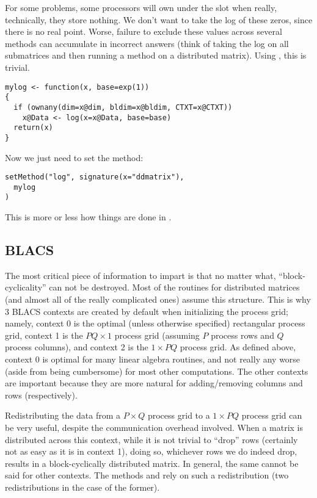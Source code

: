 For some problems, some processors will own  under the  slot when really, technically, they store nothing.  We don't want to take the log of these zeros, since there is no real point.  Worse, failure to exclude these values across several methods can accumulate in incorrect answers (think of taking the log on all submatrices and then running a  method on a distributed matrix).  Using , this is trivial.

\begin{lstlisting}[language=rr,title=Generating in Parallel]
mylog <- function(x, base=exp(1))
{
  if (ownany(dim=x@dim, bldim=x@bldim, CTXT=x@CTXT))
    x@Data <- log(x=x@Data, base=base)
  return(x)
}
\end{lstlisting}

Now we just need to set the method:

\begin{lstlisting}[language=rr,title=Generating in Parallel]
setMethod("log", signature(x="ddmatrix"),
  mylog
)

\end{lstlisting}

This is more or less how things are done in .

\subsection{BLACS}
\label{sec:ictxt}

The most critical piece of information to impart is that no matter what, ``block-cyclicality'' can not be destroyed.  Most of the routines for distributed matrices (and almost all of the really complicated ones) assume this structure.  This is why 3 BLACS contexts are created by default when initializing the process grid; namely, context 0 is the optimal (unless otherwise specified) rectangular process grid, context 1 is the $PQ\times 1$ process grid (assuming $P$ process rows and $Q$ process columns), and context 2 is the $1\times PQ$ process grid.  As defined above, context 0 is optimal for many linear algebra routines, and not really any worse (aside from being cumbersome) for most other computations.  The other contexts are important because they are more natural for adding/removing columns and rows (respectively).

Redistributing the data from a $P\times Q$ process grid to a $1\times PQ$ process grid can be very useful, despite the communication overhead involved.  When a matrix is distributed across this context, while it is not trivial to ``drop'' rows (certainly not as easy as it is in context 1), doing so, whichever rows we do indeed drop, results in a block-cyclically distributed matrix.  In general, the same cannot be said for other contexts.  The  methods \code{[} and  rely on such a redistribution (two redistributions in the case of the former).
